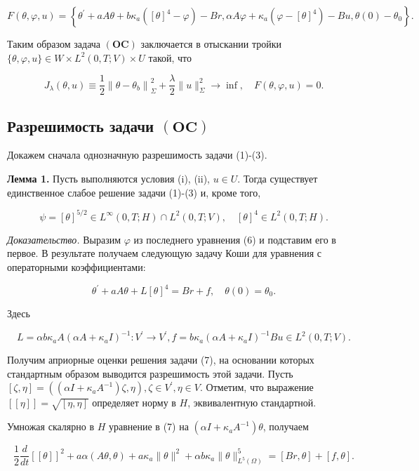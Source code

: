 \[
F(\theta, \varphi, u)=\left\{\theta^{\prime}+a A
\theta+b \kappa_{a}\left([\theta]^{4}-\varphi\right)-B r,
\alpha A \varphi+\kappa_{a}\left(\varphi-[\theta]^{4}\right)-B u, \theta(0)-\theta_{0}\right\}.
\]

Таким образом задача $(\mathbf{OC})$ заключается в отыскании тройки
$\{\theta, \varphi, u\} \in W \times L^{2}(0, T ; V) \times U$ такой, что

\[
J_{\lambda}(\theta, u) \equiv \frac{1}{2}\left\|\theta-\theta_{b}\right\|_{\Sigma}^{2}+
\frac{\lambda}{2}\|u\|_{\Sigma}^{2} \rightarrow \inf , \quad F(\theta, \varphi, u)=0.
\]

\subsection{Разрешимость задачи $(\mathbf{OC})$}\label{subsec:ch2/sec3/subsec3}
Докажем сначала однозначную разрешимость задачи (1)-(3).

\textbf{Лемма 1.}
Пусть выполняются условия (i), (ii), $u \in U$.
Тогда существует единственное слабое решение задачи (1)-(3) и, кроме того,

\[
\psi=[\theta]^{5 / 2} \in L^{\infty}(0, T; H) \cap L^{2}(0, T ; V),
\quad[\theta]^{4} \in L^{2}(0, T ; H).
\]

\textit{Доказательство.}
Выразим $\varphi$ из последнего уравнения (6) и подставим его в первое.
В результате получаем следующую задачу Коши для уравнения с операторными коэффициентами:

\[
\theta^{\prime}+a A \theta+L[\theta]^{4}=B r+f, \quad \theta(0)=\theta_{0}.
\]

Здесь

\[
L=\alpha b \kappa_{a} A\left(\alpha A+\kappa_{a} I\right)^{-1}: V^{\prime}
\rightarrow V^{\prime}, f=b \kappa_{a}\left(\alpha A+\kappa_{a} I\right)^{-1} B u \in L^{2}(0, T ; V).
\]

Получим априорные оценки решения задачи (7), на основании которых стандартным образом выводится
разрешимость этой задачи.
Пусть $[\zeta, \eta]=\left(\left(\alpha I+\kappa_{a} A^{-1}\right) \zeta,
\eta\right), \zeta \in V^{\prime}, \eta \in V$.
Отметим, что выражение $[[\eta]]=\sqrt{[\eta, \eta]}$ определяет норму в $H$, эквивалентную стандартной.

Умножая скалярно в $H$ уравнение в (7) на $\left(\alpha I+\kappa_{a} A^{-1}\right) \theta$, получаем

\[
\frac{1}{2} \frac{d}{d t}[[\theta]]^{2}+a
\alpha(A \theta, \theta)+a \kappa_{a}\|\theta\|^{2}+\alpha
b \kappa_{a}\|\theta\|_{L^{5}(\Omega)}^{5}=[B r, \theta]+[f, \theta].
\]

